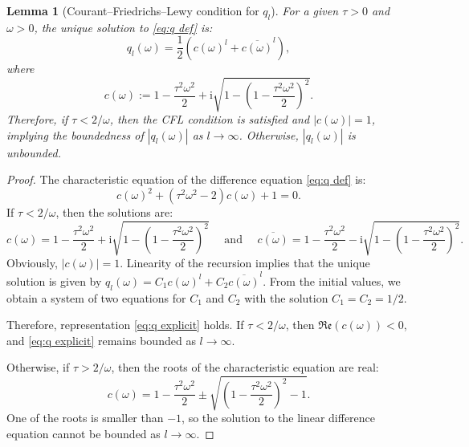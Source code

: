 \documentclass[a4paper,11pt,bibliography=totoc,listof=totoc,headinclude=true,cleardoublepage=empty,oneside]{scrbook}
\newtheorem{lemma}[theorem]{Lemma}
\renewcommand{\i}{\mathrm{i}}
\renewcommand{\Re}{\mathfrak{Re}}
\begin{document}
\begin{lemma}[Courant--Friedrichs--Lewy condition for $q_l$]\label{lemma:cfl}
    For a given $\tau > 0$ and $\omega > 0$, the unique solution to \eqref{eq:q def} is:
    \begin{equation}\label{eq:q explicit}
        q_l(\omega) =  \frac{1}{2}\left( c(\omega)^l + \overline{c(\omega)}^l\right),
    \end{equation}
    where 
    \begin{equation*}
        c(\omega) := 1 - \frac{\tau^2 \omega^2}{2} + \i \sqrt{1 - \left(1 - \frac{\tau^2 \omega^2}{2}\right)^2}.
    \end{equation*}
    Therefore, if $\tau < 2/\omega$, then the CFL condition is satisfied and $|c(\omega)|=1$, implying the boundedness of $|q_l(\omega)|$ as $l \rightarrow \infty$. Otherwise, $|q_l(\omega)|$ is unbounded.
\end{lemma}
\begin{proof}
    The characteristic equation of the difference equation \eqref{eq:q def} is:
    \begin{equation*}
        c(\omega)^2 + (\tau^2\omega^2 - 2)c(\omega) + 1 = 0. 
    \end{equation*}
    If $\tau < 2/\omega$, then the solutions are:
    \begin{equation*}
        c(\omega) = 1 - \frac{\tau^2 \omega^2}{2} + \i \sqrt{1 - \left(1 - \frac{\tau^2 \omega^2}{2}\right)^2} \quad \text{ and } \quad \overline{c(\omega)} = 1 - \frac{\tau^2 \omega^2}{2} - \i \sqrt{1 - \left(1 - \frac{\tau^2 \omega^2}{2}\right)^2}.
    \end{equation*}
     Obviously, $|c(\omega)|=1$. Linearity of the recursion implies that the unique solution is given by $q_l(\omega) = C_1 c(\omega)^l + C_2 \overline{c(\omega)}^l$. From the initial values, we obtain a system of two equations for $C_1$ and $C_2$ with the solution $C_1 = C_2 = 1/2$.

    Therefore, representation \eqref{eq:q explicit} holds. If $\tau < 2/\omega$, then $\Re(c(\omega)) < 0$, and \eqref{eq:q explicit} remains bounded as $l\rightarrow \infty$. 
    
    Otherwise, if $\tau > 2/\omega$, then the roots of the characteristic equation are real:
    \begin{equation*}
        c(\omega) = 1 - \frac{\tau^2 \omega^2}{2} \pm \sqrt{\left(1 - \frac{\tau^2 \omega^2}{2}\right)^2 -1 }.
    \end{equation*}
    One of the roots is smaller than $-1$, so the solution to the linear difference equation cannot be bounded as $l\rightarrow\infty$.
\end{proof}
\end{document}
